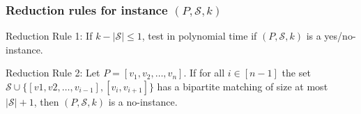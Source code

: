 \documentclass{beamer}
\begin{document}
\begin{frame}
    \frametitle{Reduction rules for instance $(P, \mathcal{S}, k)$}
    \pause{}
    \begin{block}{Reduction Rule 1:}
        If $k - |\mathcal{S}| \le 1$, test in polynomial time if $(P, \mathcal{S}, k)$ is a yes/no-instance.

    \end{block}

    \pause{}
    \begin{block}{Reduction Rule 2:}
        Let $P = [v_1, v_2, \dots, v_n]$.
        If for all $i \in [n-1]$ the set $\mathcal{S} \cup \{[v1, v2, \dots, v_{i-1}], [v_i, v_{i+1}]\}$ has a bipartite matching of size at most $|\mathcal{S}| + 1$, then $(P, \mathcal{S}, k)$ is a no-instance.
    \end{block}
\end{frame}



\end{document}
